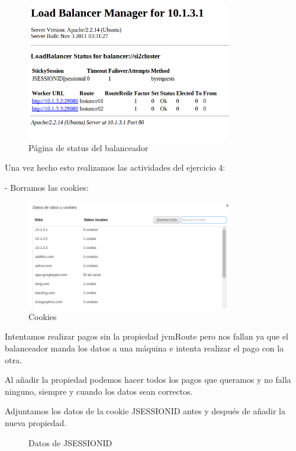 \documentclass[a4paper, 10pt]{article}
\begin{document}
\begin{figure}[hbtp]
	\centering
	\includegraphics[width=0.8\textwidth]{../../P3/pantallazos/manager.png}
	\caption { Página de status del balanceador }
\end{figure}


Una vez hecho esto realizamos las actividades del ejercicio 4:

- Borramos las cookies:
\begin{figure}[hbtp]
	\centering
	\includegraphics[width=0.8\textwidth]{../../P3/pantallazos/ej4_cookies.png}
	\caption { Cookies }
\end{figure}
\newpage
Intentamos realizar pagos sin la propiedad jvmRoute pero nos fallan ya que el balanceador manda los datos a una máquina e intenta realizar el pago con la otra.


Al añadir la propiedad podemos hacer todos los pagos que queramos y no falla ninguno, siempre y cuando los datos sean correctos.

Adjuntamos los datos de la cookie JSESSIONID antes y después de añadir la nueva propiedad.

\begin{figure}[htbp]
	\centering
	\caption{Datos de JSESSIONID}
\end{figure}
\end{document}
